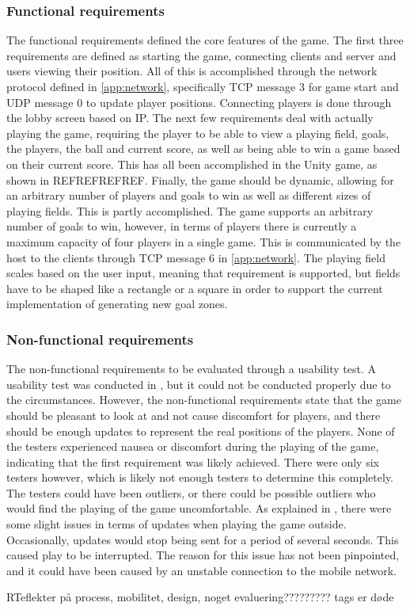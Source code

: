 \subsubsection{Functional requirements}
The functional requirements defined the core features of the game.
The first three requirements are defined as starting the game, connecting clients and server and users viewing their position.
All of this is accomplished through the network protocol defined in \autoref{app:network}, specifically TCP message 3 for game start and UDP message 0 to update player positions.
Connecting players is done through the lobby screen based on IP.
The next few requirements deal with actually playing the game, requiring the player to be able to view a playing field, goals, the players, the ball and current score, as well as being able to win a game based on their current score.
This has all been accomplished in the Unity game, as shown in REFREFREFREF.
Finally, the game should be dynamic, allowing for an arbitrary number of players and goals to win as well as different sizes of playing fields.
This is partly accomplished.
The game supports an arbitrary number of goals to win, however, in terms of players there is currently a maximum capacity of four players in a single game.
This is communicated by the host to the clients through TCP message 6 in \autoref{app:network}.
The playing field scales based on the user input, meaning that requirement is supported, but fields have to be shaped like a rectangle or a square in order to support the current implementation of generating new goal zones.

\subsubsection{Non-functional requirements}
The non-functional requirements to be evaluated through a usability test.
A usability test was conducted in , but it could not be conducted properly due to the circumstances.
However, the non-functional requirements state that the game should be pleasant to look at and not cause discomfort for players, and there should be enough updates to represent the real positions of the players.
None of the testers experienced nausea or discomfort during the playing of the game, indicating that the first requirement was likely achieved.
There were only six testers however, which is likely not enough testers to determine this completely.
The testers could have been outliers, or there could be possible outliers who would find the playing of the game uncomfortable.
As explained in , there were some slight issues in terms of updates when playing the game outside.
Occasionally, updates would stop being sent for a period of several seconds.
This caused play to be interrupted.
The reason for this issue has not been pinpointed, and it could have been caused by an unstable connection to the mobile network.



RTeflekter på process, mobilitet, design, noget evaluering?????????
tags 
er døde
